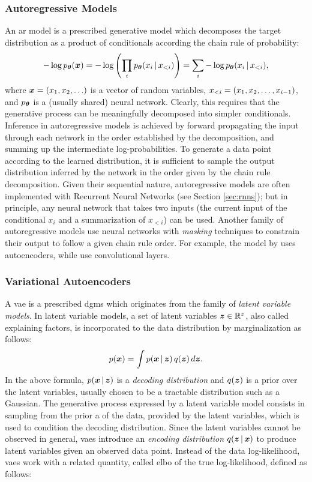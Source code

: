 \subsubsection*{Autoregressive Models}
An \gls{ar} model is a prescribed generative model which decomposes the target distribution as a product of conditionals according the chain rule of probability:
$$-\log p_{\Param}(\Vector{x}) = -\log\Par{\prod_i p_{\Param}(x_i \given x_{<i})} = \sum_i -\log p_{\Param}(x_i \given x_{<i}),$$
where $\Vector{x} = (x_1, x_2, \ldots)$ is a vector of random variables, $x_{<i} = \left( x_1, x_2, \ldots, x_{i-1} \right)$, and $p_{\boldsymbol{\theta}}$ is a (usually shared) neural network. Clearly, this requires that the generative process can be meaningfully decomposed into simpler conditionals.
Inference in autoregressive models is achieved by forward propagating the input through each network in the order established by the decomposition, and summing up the intermediate log-probabilities. To generate a data point according to the learned distribution, it is sufficient to sample the output distribution inferred by the network in the order given by the chain rule decomposition. Given their sequential nature, autoregressive models are often implemented with Recurrent Neural Networks (see Section \ref{sec:rnns}); but in principle, any neural network that takes two inputs (the current input of the conditional $x_i$ and a summarization of $x_{<i}$) can be used. Another family of autoregressive models use neural networks with \emph{masking} techniques to constrain their output to follow a given chain rule order. For example, the model by \citet{germain2015made} uses autoencoders, while \citet{vandenoord2016wavenet} use convolutional layers.

\subsubsection*{Variational Autoencoders}
A \gls{vae} \citep{kingma2014vae} is a prescribed \glspl{dgm} which originates from the family of \emph{latent variable models}. In latent variable models, a set of latent variables $\Vector{z} \in \Real^z$, also called explaining factors, is incorporated to the data distribution by marginalization as follows:
$$p(\Vector{x}) = \int p(\Vector{x} \given \Vector{z})\, q(\Vector{z})\, d\Vector{z}.$$
In the above formula, $p(\Vector{x} \given \Vector{z})$ is a \emph{decoding distribution} and $q(\Vector{z})$ is a prior over the latent variables, usually chosen to be a tractable distribution such as a Gaussian. The generative process expressed by a latent variable model consists in sampling from the prior a  of the data, provided by the latent variables, which is used to condition the decoding distribution. Since the latent variables cannot be observed in general, \glspl{vae} introduce an \emph{encoding distribution} $q(\Vector{z} \given \Vector{x})$ to produce latent variables given an observed data point. Instead of the data log-likelihood, \glspl{vae} work with a related quantity, called \gls{elbo} of the true log-likelihood, defined as follows:


